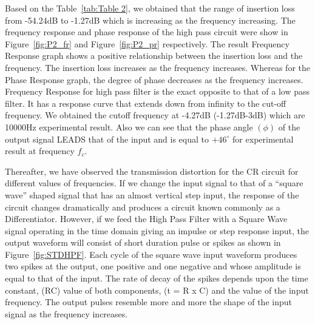 \documentclass[a4paper, 12pt, english]{article}
\begin{document}
Based on the Table~\ref{tab:Table 2}, we obtained that the range of insertion
loss from -54.24dB to -1.27dB which is increasing as the frequency increasing.
The frequency response and phase response of the high pass circuit were show in
Figure~\ref{fig:P2_fr} and Figure~\ref{fig:P2_pr} respectively. The result
Frequency Response graph shows a positive relationship between the insertion
loss and the frequency. The insertion loss increases as the frequency
increases. Whereas for the Phase Response graph, the degree of phase decreases
as the frequency increases. Frequency Response for high pass filter is the
exact opposite to that of a low pass filter. It has a response curve that
extends down from infinity to the cut-off frequency. We obtained the cutoff
frequency at -4.27dB (-1.27dB-3dB) which are 10000Hz experimental result. Also
we can see that the phase angle $(\phi)$ of the output signal LEADS that of the
input and is equal to $+46^{\circ}$ for experimental result at frequency
$f_{c}$. \newline

Thereafter, we have observed the transmission distortion for the CR circuit for
different values of frequencies. If we change the input signal to that of a
“square wave” shaped signal that has an almost vertical step input, the
response of the circuit changes dramatically and produces a circuit known
commonly as a Differentiator. However, if we feed the High Pass Filter with a
Square Wave signal operating in the time domain giving an impulse or step
response input, the output waveform will consist of short duration pulse or
spikes as shown in Figure~\ref{fig:STDHPF}. Each cycle of the square wave input
waveform produces two spikes at the output, one positive and one negative and
whose amplitude is equal to that of the input. The rate of decay of the spikes
depends upon the time constant, (RC) value of both components, (t = R x C) and
the value of the input frequency. The output pulses resemble more and more the
shape of the input signal as the frequency increases.
\end{document}
